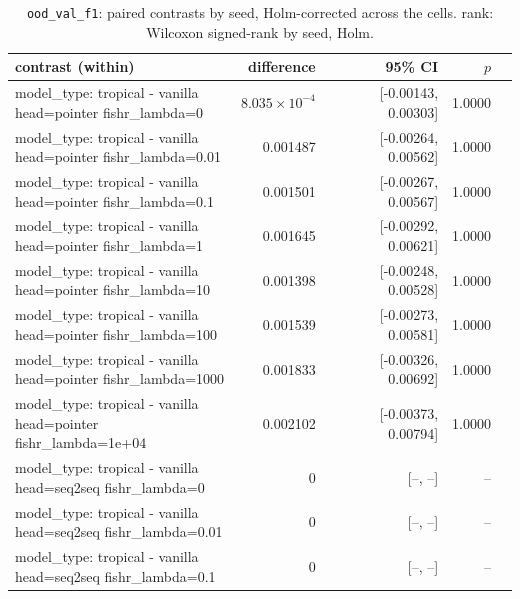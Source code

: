 \documentclass[10pt]{article}
\makeatletter
\newcommand{\stackcell}[1]{\begin{tabular}[t]{@{}l@{}}#1\end{tabular}}
\makeatother
\begin{document}
{\small
\begin{longtable}{lrrrl}
\caption{\texttt{ood\_val\_f1}: paired contrasts by seed, Holm-corrected across the cells. rank: Wilcoxon signed-rank by seed, Holm.}\label{tab:paired-ood_val_f1}\\
\toprule
contrast (within) & difference & 95\% CI & $p$ & \\
\midrule
\endhead
\stackcell{model\_type: tropical - vanilla\\\footnotesize head=pointer fishr\_lambda=0 } & $8.035\times10^{-4}$ & [-0.00143, 0.00303] & 1.0000 & \\
\stackcell{model\_type: tropical - vanilla\\\footnotesize head=pointer fishr\_lambda=0.01 } & 0.001487 & [-0.00264, 0.00562] & 1.0000 & \\
\stackcell{model\_type: tropical - vanilla\\\footnotesize head=pointer fishr\_lambda=0.1 } & 0.001501 & [-0.00267, 0.00567] & 1.0000 & \\
\stackcell{model\_type: tropical - vanilla\\\footnotesize head=pointer fishr\_lambda=1 } & 0.001645 & [-0.00292, 0.00621] & 1.0000 & \\
\stackcell{model\_type: tropical - vanilla\\\footnotesize head=pointer fishr\_lambda=10 } & 0.001398 & [-0.00248, 0.00528] & 1.0000 & \\
\stackcell{model\_type: tropical - vanilla\\\footnotesize head=pointer fishr\_lambda=100 } & 0.001539 & [-0.00273, 0.00581] & 1.0000 & \\
\stackcell{model\_type: tropical - vanilla\\\footnotesize head=pointer fishr\_lambda=1000 } & 0.001833 & [-0.00326, 0.00692] & 1.0000 & \\
\stackcell{model\_type: tropical - vanilla\\\footnotesize head=pointer fishr\_lambda=1e+04 } & 0.002102 & [-0.00373, 0.00794] & 1.0000 & \\
\stackcell{model\_type: tropical - vanilla\\\footnotesize head=seq2seq fishr\_lambda=0 } & 0 & [--, --] & -- & \\
\stackcell{model\_type: tropical - vanilla\\\footnotesize head=seq2seq fishr\_lambda=0.01 } & 0 & [--, --] & -- & \\
\stackcell{model\_type: tropical - vanilla\\\footnotesize head=seq2seq fishr\_lambda=0.1 } & 0 & [--, --] & -- & \\

\end{longtable}}
\end{document}
